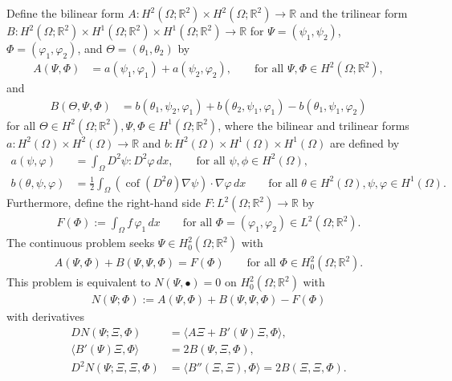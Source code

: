 \documentclass[a4paper]{amsart}
\theoremstyle{definition}
\numberwithin{equation}{section}
\numberwithin{theorem}{section}
\newcommand{\R}{\mathbb{R}}
\newcommand{\cof}{\operatorname{cof}}
\begin{document}
Define the bilinear form $A:H^2(\Omega;\R^2)\times H^2(\Omega;\R^2)\to\R$ 
and the trilinear form 
$B:H^2(\Omega;\R^2)\times H^1(\Omega;\R^2)\times H^1(\Omega;\R^2)\to\R$
for $\Psi=(\psi_1,\psi_2)$, $\Phi=(\varphi_1,\varphi_2)$, and 
$\Theta=(\theta_1,\theta_2)$ by 
\begin{align*}
    A(\Psi,\Phi) &= a(\psi_1,\varphi_1) + a(\psi_2,\varphi_2) ,
    \qquad \text{for all }\Psi,\Phi\in H^2(\Omega;\R^2),
\end{align*}
and 
\begin{align*}
    B(\Theta,\Psi,\Phi) &= b(\theta_1,\psi_2,\varphi_1) + b(\theta_2,\psi_1,\varphi_1)
        - b(\theta_1,\psi_1,\varphi_2)
\end{align*}
for all $\Theta\in H^2(\Omega;\R^2), \Psi,\Phi\in H^1(\Omega;\R^2)$,
where the bilinear and trilinear forms 
$a:H^2(\Omega)\times H^2(\Omega)\to\R$ and 
$b:H^2(\Omega)\times H^1(\Omega)\times H^1(\Omega)$ are defined by 
\begin{align*}
    a(\psi,\varphi) &= \int_\Omega D^2 \psi:D^2\varphi\,dx,
    \qquad \text{for all }\psi,\phi\in H^2(\Omega),\\
    b(\theta,\psi,\varphi) 
       &= \frac{1}{2}\int_\Omega
            (\cof(D^2\theta)\nabla \psi)\cdot\nabla \varphi\,dx
    \qquad \text{for all }\theta\in H^2(\Omega), \psi,\varphi\in H^1(\Omega).
\end{align*}
Furthermore, define the right-hand side $F:L^2(\Omega;\R^2)\to\R$ by 
\begin{align*}
    F(\Phi):= \int_\Omega f\,\varphi_1\,dx
    \qquad \text{for all }\Phi=(\varphi_1,\varphi_2)\in L^2(\Omega;\R^2).
\end{align*}
The continuous problem seeks $\Psi\in H^2_0(\Omega;\R^2)$ with 
\begin{align}\label{e:vK_cont_problem}
    A(\Psi,\Phi) + B(\Psi,\Psi,\Phi) = F(\Phi)
    \qquad \text{for all }\Phi\in H^2_0(\Omega;\R^2).
\end{align}
This problem is equivalent to $N(\Psi,\bullet)=0$ on $H^2_0(\Omega;\R^2)$
with  
\begin{align*}
    N(\Psi;\Phi):=A(\Psi,\Phi)+B(\Psi,\Psi,\Phi)-F(\Phi)
\end{align*}
with derivatives 
\begin{subequations}
\begin{align}
    DN(\Psi;\Xi,\Phi) &= \langle A\Xi + B'(\Psi)\Xi,\Phi\rangle,\\
    \langle B'(\Psi)\Xi,\Phi\rangle&= 2 B(\Psi,\Xi,\Phi),\\
    \label{e:D2N}
    D^2N(\Psi;\Xi,\Xi,\Phi) &= \langle B''(\Xi,\Xi),\Phi\rangle 
       = 2B(\Xi,\Xi,\Phi).
\end{align}
\end{subequations}
\end{document}
